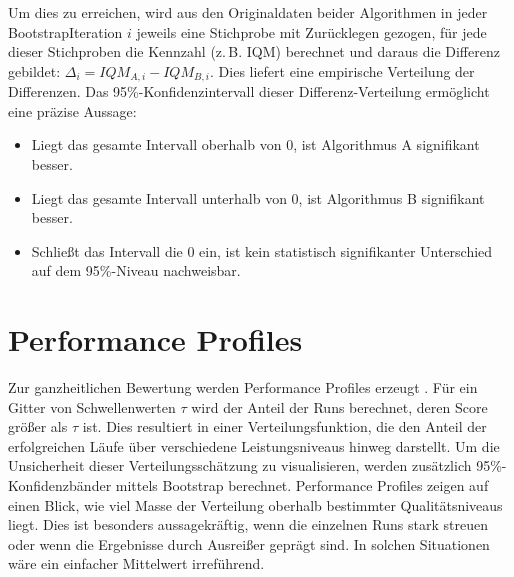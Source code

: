 Um dies zu erreichen, wird aus den Original\-daten beider Algorithmen in jeder Bootstrap\-Iteration \(i\) jeweils eine Stich\-probe mit Zurücklegen gezogen, für jede dieser Stich\-proben die Kennzahl (z.\,B. \ac{IQM}) berechnet und daraus die Differenz gebildet: \(\Delta_i = IQM_{A,i} - IQM_{B,i}\). Dies liefert eine empirische Verteilung der Differenzen. Das 95\%-Konfidenz\-intervall dieser Differenz\hyp{}Verteilung ermöglicht eine präzise Aussage:
\begin{itemize}
    \item Liegt das gesamte Intervall oberhalb von 0, ist Algorithmus A signifikant besser.
    \item Liegt das gesamte Intervall unterhalb von 0, ist Algorithmus B signifikant besser.
    \item Schließt das Intervall die 0 ein, ist kein statistisch signifikanter Unterschied auf dem 95\%-Niveau nachweisbar.
\end{itemize}

\section{Performance Profiles}

Zur ganzheitlichen Bewertung werden Performance Profiles erzeugt \citep{statistical_rl_evaluation}. Für ein Gitter von Schwellenwerten $\tau$ wird der Anteil der Runs berechnet, deren Score größer als $\tau$ ist. Dies resultiert in einer Verteilungsfunktion, die den Anteil der erfolgreichen Läufe über verschiedene Leistungsniveaus hinweg darstellt. Um die Unsicherheit dieser Verteilungsschätzung zu visualisieren, werden zusätzlich 95\%-Konfidenzbänder mittels Bootstrap berechnet. Performance Profiles zeigen auf einen Blick, wie viel Masse der Verteilung oberhalb bestimmter Qualitätsniveaus liegt. Dies ist besonders aussagekräftig, wenn die einzelnen Runs stark streuen oder wenn die Ergebnisse durch Ausreißer geprägt sind. In solchen Situationen wäre ein einfacher Mittelwert irreführend.
